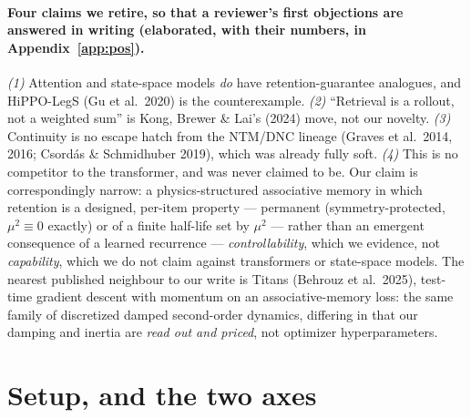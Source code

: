 \documentclass{article}
\begin{document}
{\footnotesize\paragraph{Four claims we retire, so that a reviewer's first objections are answered in writing (elaborated, with their numbers, in Appendix~\ref{app:pos}).} \emph{(1)} Attention and state-space models \emph{do} have retention-guarantee analogues, and HiPPO-LegS (Gu et al.\ 2020) is the counterexample. \emph{(2)} ``Retrieval is a rollout, not a weighted sum'' is Kong, Brewer \& Lai's (2024) move, not our novelty. \emph{(3)} Continuity is no escape hatch from the NTM/DNC lineage (Graves et al.\ 2014, 2016; Csord\'as \& Schmidhuber 2019), which was already fully soft. \emph{(4)} This is no competitor to the transformer, and was never claimed to be. Our claim is correspondingly narrow: a physics-structured associative memory in which retention is a designed, per-item property --- permanent (symmetry-protected, $\mu^2\equiv0$ exactly) or of a finite half-life set by $\mu^2$ --- rather than an emergent consequence of a learned recurrence --- \emph{controllability}, which we evidence, not \emph{capability}, which we do not claim against transformers or state-space models. The nearest published neighbour to our write is Titans (Behrouz et al.\ 2025), test-time gradient descent with momentum on an associative-memory loss: the same family of discretized damped second-order dynamics, differing in that our damping and inertia are \emph{read out and priced}, not optimizer hyperparameters.\par}

\section{Setup, and the two axes}\label{sec:setup}
\end{document}
